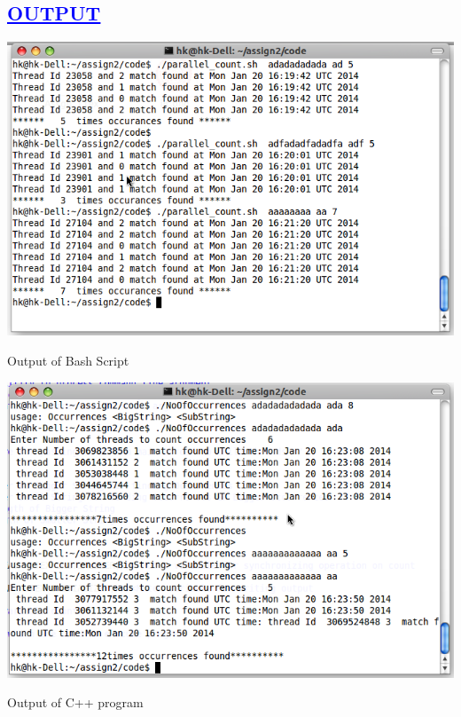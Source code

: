\documentclass[a4paper,12pt]{report}
\begin{document}
\begin{center}
\chapter{\textcolor{blue}{\underline {OUTPUT}}}

 \includegraphics[width=13 cm,height=13 cm]{./Screenshot1.png}

Output of Bash Script
\end{center}
\begin{center}
 \includegraphics[width=13 cm,height=13 cm]{./Screenshot2.png}

Output of C++ program
\end{center}
\end{document}
